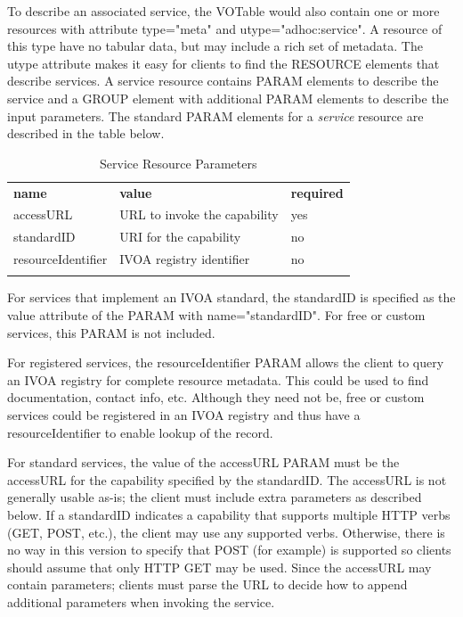 \documentclass[11pt,a4paper]{ivoa}
\newcommand{\attval}[2]{#1={\allowbreak}{"}#2{"}}
\begin{document}
To describe an associated service, the VOTable would also
contain one or more resources with attribute \attval{type}{meta} and
\attval{utype}{adhoc:service}.
A resource of this type have no tabular data,
but may include a rich set of metadata. The utype attribute makes it
easy for clients to find the RESOURCE elements that describe services.
A service resource contains PARAM elements to describe the service and
a GROUP element with additional PARAM elements to describe the input
parameters.
The standard PARAM elements for a {\em service\/} resource
are described in the table below.
\begin{table}[h]
\begin{center}
\begin{tabular}{|l|l|l|}
\sptablerule
{\bf name}  &  {\bf value}  & {\bf required}  \\
\sptablerule
accessURL           &  URL to invoke the capability  &  yes  \\
standardID          &  URI for the capability        &  no   \\
resourceIdentifier  & IVOA registry identifier       &  no   \\
\sptablerule
\end{tabular}
\end{center}
\caption{Service Resource Parameters}
\end{table}

For services that implement an IVOA standard, the standardID is specified
as the value attribute of the PARAM with \attval{name}{standardID}.
For free or custom services, this PARAM is not included.

For registered services, the resourceIdentifier PARAM allows the client
to query an IVOA registry for complete resource metadata. This could be
used to find documentation, contact info, etc. Although they need not be,
free or custom services could be registered in an IVOA registry and thus
have a resourceIdentifier to enable lookup of the record.

For standard services, the value of the accessURL PARAM must be the
accessURL for the capability specified by the standardID. The accessURL
is not generally usable as-is; the client must include extra parameters
as described below. If a standardID indicates a capability that supports
multiple HTTP verbs (GET, POST, etc.), the client may use any supported
verbs. Otherwise, there is no way in this version to specify that POST
(for example) is supported so clients should assume that only HTTP GET
may be used. Since the accessURL may contain parameters; clients must
parse the URL to decide how to append additional parameters when
invoking the service.
\end{document}
